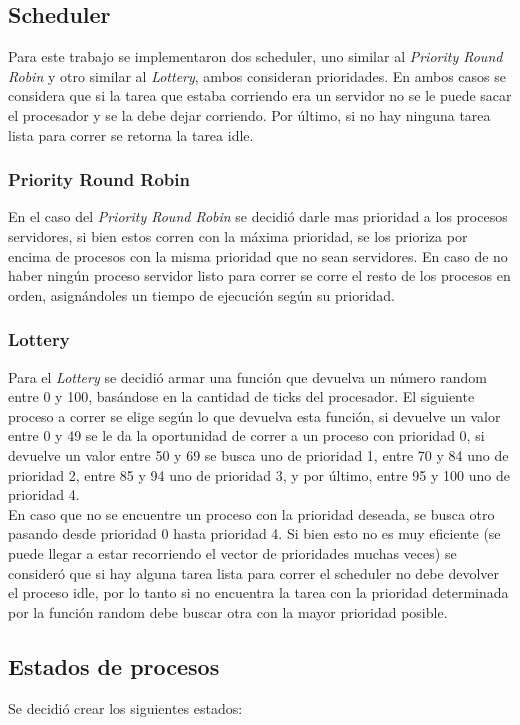 \documentclass[a4paper,10pt]{article}
\begin{document}
\subsection{Scheduler}
Para este trabajo se implementaron dos scheduler, uno similar al \textit{Priority Round Robin} 
y otro similar al \textit{Lottery}, ambos consideran prioridades. En ambos casos se considera 
que si la tarea que estaba corriendo era un servidor no se le puede sacar el procesador y se 
la debe dejar corriendo. Por último, si no hay ninguna tarea lista para correr se retorna la 
tarea idle.

\subsubsection{Priority Round Robin}
En el caso del \textit{Priority Round Robin} se decidió darle mas prioridad a los procesos 
servidores, si bien estos corren con la máxima prioridad, se los prioriza por encima de procesos 
con la misma prioridad que no sean servidores. En caso de no haber ningún proceso servidor listo 
para correr se corre el resto de los procesos en orden, asignándoles un tiempo de ejecución según 
su prioridad.

\subsubsection{Lottery}
Para el \textit{Lottery} se decidió armar una función que devuelva un número random entre 0 y 100, basándose 
en la cantidad de ticks del procesador. El siguiente proceso a correr se elige según lo que devuelva esta función, 
si devuelve un valor entre 0 y 49 se le da la oportunidad de correr a un proceso con prioridad 0, 
si devuelve un valor entre 50 y 69 se busca uno de prioridad 1, entre 70 y 84 uno de prioridad 2, entre 85 y 94 
uno de prioridad 3, y por último, entre 95 y 100 uno de prioridad 4.\\
En caso que no se encuentre un proceso con la prioridad deseada, se busca otro pasando desde prioridad 0 hasta 
prioridad 4. Si bien esto no es muy eficiente (se puede llegar a estar recorriendo el vector de prioridades muchas 
veces) se consideró que si hay alguna tarea lista para correr el scheduler no debe devolver el proceso idle, por lo 
tanto si no encuentra la tarea con la prioridad determinada por la función random debe buscar otra con la mayor 
prioridad posible.

\subsection{Estados de procesos}
Se decidió crear los siguientes estados:
\end{document}

